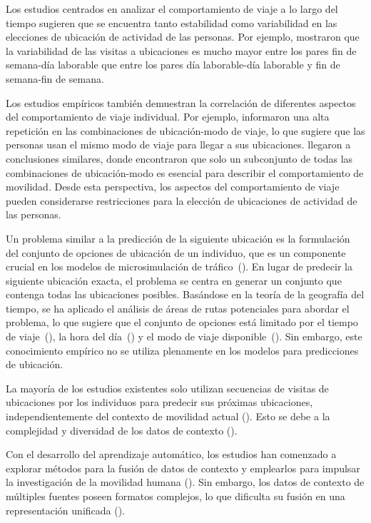 Los estudios centrados en analizar el comportamiento de 
viaje a lo largo del tiempo sugieren que se encuentra tanto 
estabilidad como variabilidad en las elecciones de ubicación 
de actividad de las personas. Por ejemplo, \cite{dharmowijoyo2017analysing} mostraron que la variabilidad de las visitas
a ubicaciones es mucho mayor entre los pares fin de 
semana-día laborable que entre los pares día laborable-día 
laborable y fin de semana-fin de semana. 

Los estudios 
empíricos también demuestran la correlación de diferentes
aspectos del comportamiento de viaje individual. Por ejemplo, \cite{susilo2014repetitions} informaron una alta repetición 
en las combinaciones de ubicación-modo de viaje, lo que sugiere que las 
personas usan el mismo modo de viaje para llegar a sus ubicaciones. 
\cite{hong2022conserved} llegaron a conclusiones similares, donde 
encontraron que solo un subconjunto de todas las combinaciones de 
ubicación-modo es esencial para describir el comportamiento de movilidad. 
Desde esta perspectiva, los aspectos del comportamiento de viaje 
pueden considerarse restricciones para la elección de ubicaciones de 
actividad de las personas.

Un problema similar a la predicción de la siguiente ubicación es la 
formulación del conjunto de opciones de ubicación de un individuo, que 
es un componente crucial en los modelos de microsimulación de 
tráfico~(\cite{mariante2018modeling}). En lugar de predecir la siguiente ubicación exacta, 
el problema se centra en generar un conjunto que contenga todas las 
ubicaciones posibles. Basándose en la teoría de la geografía del tiempo, 
se ha aplicado el análisis de áreas de rutas potenciales para abordar 
el problema, lo que sugiere que el conjunto de opciones está limitado 
por el tiempo de viaje~(\cite{scott2012modeling}), la hora del día~(\cite{yoon2012feasibility}) y el modo 
de viaje disponible~(\cite{neutens2007space}). Sin embargo, este conocimiento empírico 
no se utiliza plenamente en los modelos para predicciones de ubicación.

La mayoría de los estudios existentes solo utilizan secuencias de 
visitas de ubicaciones por los individuos para predecir sus 
próximas ubicaciones, independientemente del contexto de movilidad 
actual (\cite{laha2018real}). Esto se debe a la complejidad y 
diversidad de los datos de contexto (\cite{tedjopurnomo2020survey}). 

Con el desarrollo del aprendizaje automático, los estudios han 
comenzado a explorar métodos para la fusión de datos de contexto y 
emplearlos para impulsar la investigación de la movilidad humana 
(\cite{zheng2018survey,lau2019survey}). Sin embargo, los datos de 
contexto de múltiples fuentes poseen formatos complejos, lo que 
dificulta su fusión en una representación unificada (\cite{liao2018multi}). 

